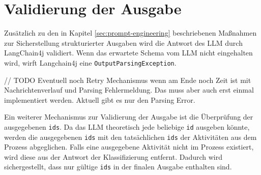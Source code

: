 \section{Validierung der Ausgabe}\label{sec:validierung-der-ausgabe}

Zusätzlich zu den in Kapitel \ref{sec:prompt-engineering} beschriebenen Maßnahmen zur Sicherstellung strukturierter Ausgaben wird die Antwort des \ac{LLM} durch LangChain4j validiert. Wenn das erwartete Schema vom \ac{LLM} nicht eingehalten wird, wirft Langchain4j eine \texttt{OutputParsingException}.

// TODO Eventuell noch Retry Mechanismus wenn am Ende noch Zeit ist mit Nachrichtenverlauf und Parsing Fehlermeldung. Das muss aber auch erst einmal implementiert werden. Aktuell gibt es nur den Parsing Error.

Ein weiterer Mechanismus zur Validierung der Ausgabe ist die Überprüfung der ausgegebenen \texttt{ids}. Da das \ac{LLM} theoretisch jede beliebige \texttt{id} ausgeben könnte, werden die ausgegebenen \texttt{ids} mit den tatsächlichen \texttt{ids} der Aktivitäten aus dem Prozess abgeglichen. Falls eine ausgegebene Aktivität nicht im Prozess existiert, wird diese aus der Antwort der Klassifizierung entfernt. Dadurch wird sichergestellt, dass nur gültige \texttt{ids} in der finalen Ausgabe enthalten sind.